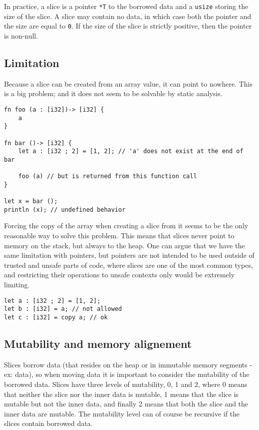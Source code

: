 In practice, a slice is a pointer \texttt{*T} to the borrowed data and a
\texttt{usize} storing the size of the slice. A slice may contain no data, in
which case both the pointer and the size are equal to \texttt{0}. If the size of
the slice is strictly positive, then the pointer is non-null.

\subsection{Limitation}%
\label{sec:slice_lim}

Because a slice can be created from an array value, it can point to nowhere.
This is a big problem; and it does not seem to be solvable by static analysis.

\begin{lstlisting}[style=coloredverbatim]
fn foo (a : [i32])-> [i32] {
    a
}

fn bar ()-> [i32] {
    let a : [i32 ; 2] = [1, 2]; // 'a' does not exist at the end of bar

    foo (a) // but is returned from this function call
}

let x = bar ();
println (x); // undefined behavior
\end{lstlisting}

Forcing the copy of the array when creating a slice from it seems to be the only
reasonable way to solve this problem. This means that slices never point to
memory on the stack, but always to the heap. One can argue that we have the same
limitation with pointers, but pointers are not intended to be used outside of
trusted and unsafe parts of code, where slices are one of the most common types,
and restricting their operations to unsafe contexts only would be extremely
limiting.

\begin{lstlisting}[style=coloredverbatim]
let a : [i32 ; 2] = [1, 2];
let b : [i32] = a; // not allowed
let c : [i32] = copy a; // ok
\end{lstlisting}



\subsection{Mutability and memory alignement}

Slices borrow data (that resides on the heap or in immutable memory segments -
ex: data), so when moving data it is important to consider the mutability of the
borrowed data. Slices have three levels of mutability, 0, 1 and 2, where 0 means
that neither the slice nor the inner data is mutable, 1 means that the slice is
mutable but not the inner data, and finally 2 means that both the slice and the
inner data are mutable. The mutability level can of course be recursive if the
slices contain borrowed data.


